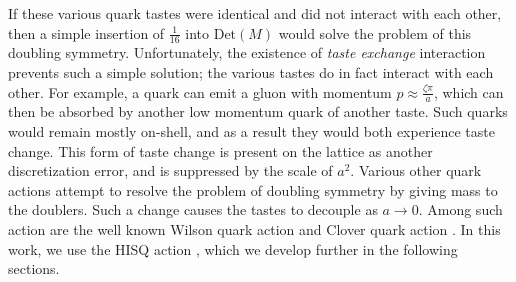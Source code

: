 If these various quark tastes were identical and did not interact with each other, then a simple insertion of $\frac{1}{16}$ into $\mathrm{Det}(M)$ would solve the problem of this doubling symmetry.  Unfortunately, the existence of \textit{taste exchange} interaction prevents such a simple solution; the various tastes do in fact interact with each other.  For example, a quark can emit a gluon with momentum $p\approx \frac{\zeta\pi}{a}$, which can then be absorbed by another low momentum quark of another taste.  Such quarks would remain mostly on-shell, and as a result they would both  experience taste change.  This form of taste change is present on the lattice as another discretization error, and is suppressed by the scale of $a^2$.  Various other quark actions attempt to resolve the problem of doubling symmetry by giving mass to the doublers.  Such a change causes the tastes to decouple as $a\rightarrow 0$.  Among such action are the well known Wilson quark action \cite{PhysRevD.10.2445} and Clover quark action \cite{SHEIKHOLESLAMI1985572}.  In this work, we use the HISQ action \cite{HISQ:2006rc}, which we develop further in the following sections.

